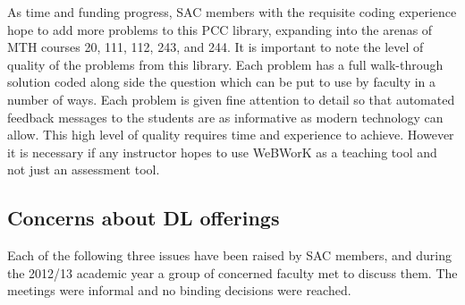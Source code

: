 As time and funding progress, SAC members with the requisite coding experience
hope to add more problems to this PCC library, expanding into the arenas of MTH
courses 20, 111, 112, 243, and 244. It is important to note the level of quality
of the problems from this library. Each problem has a full walk-through solution
coded along side the question which can be put to use by faculty in a number of
ways. Each problem is given fine attention to detail so that automated feedback
messages to the students are as informative as modern technology can allow. This
high level of quality requires time and experience to achieve. However it is
necessary if any instructor hopes to use WeBWorK as a teaching tool and not just
an assessment tool.

\subsection{Concerns about DL offerings}
Each of the following three issues have been raised by SAC members, and during
the 2012/13 academic year a group of concerned faculty met to discuss them. The
meetings were informal and no binding decisions were reached.
